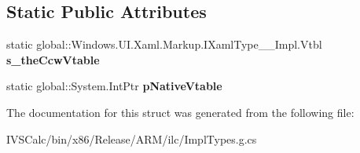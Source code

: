 \subsection*{Static Public Attributes}
\begin{DoxyCompactItemize}
\item 
\mbox{\label{struct_windows_1_1_u_i_1_1_xaml_1_1_markup_1_1_i_xaml_type_____impl_1_1_vtbl_a38434ff677002b9b73f68f276f00d6b8}} 
static global\+::\+Windows.\+U\+I.\+Xaml.\+Markup.\+I\+Xaml\+Type\+\_\+\+\_\+\+Impl.\+Vtbl {\bfseries s\+\_\+the\+Ccw\+Vtable}
\item 
\mbox{\label{struct_windows_1_1_u_i_1_1_xaml_1_1_markup_1_1_i_xaml_type_____impl_1_1_vtbl_a42d1640842c788ac62e8a6571f3dd372}} 
static global\+::\+System.\+Int\+Ptr {\bfseries p\+Native\+Vtable}
\end{DoxyCompactItemize}


The documentation for this struct was generated from the following file\+:\begin{DoxyCompactItemize}
\item 
I\+V\+S\+Calc/bin/x86/\+Release/\+A\+R\+M/ilc/Impl\+Types.\+g.\+cs\end{DoxyCompactItemize}
